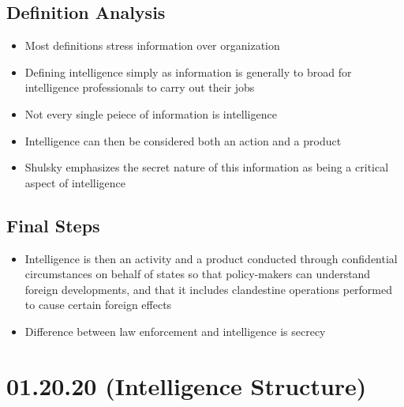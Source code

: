 \documentclass[11pt]{article}
\begin{document}
\subsection{Definition Analysis}
\label{sec:org85650e3}
\begin{itemize}
\item Most definitions stress information over organization
\item Defining intelligence simply as information is generally to broad for intelligence professionals to carry out their jobs
\item Not every single peiece of information is intelligence
\item Intelligence can then be considered both an action and a product
\item Shulsky emphasizes the secret nature of this information as being a critical aspect of intelligence
\end{itemize}
\subsection{Final Steps}
\label{sec:org394c4aa}
\begin{itemize}
\item Intelligence is then an activity and a product conducted through confidential circumstances on behalf of states so that policy-makers can understand foreign developments, and that it includes clandestine operations performed to cause certain foreign effects
\item Difference between law enforcement and intelligence is secrecy
\end{itemize}
\section{01.20.20 (Intelligence Structure)}
\label{sec:org3e76faa}
\end{document}
